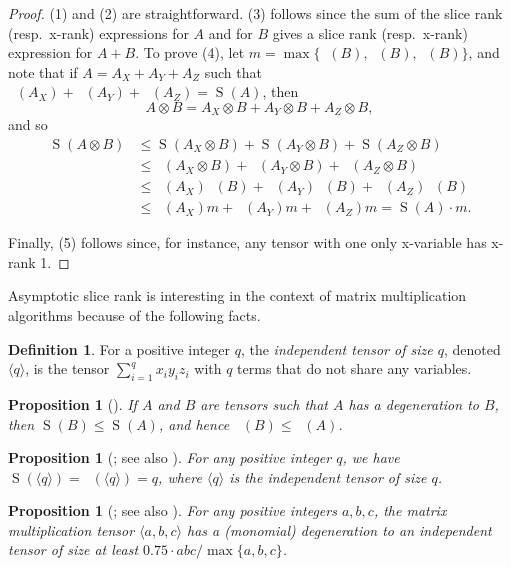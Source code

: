 \documentclass[11pt]{article}
\numberwithin{equation}{section}
\newtheorem{proposition}[theorem]{Proposition}
\theoremstyle{definition}
\newtheorem{definition}[theorem]{Definition}
\theoremstyle{plain}
\newcommand{\sr}{\mathop{\operatorname{S}}}
\newcommand{\xr}{\mathop{\operatorname{S_x}}}
\newcommand{\yr}{\mathop{\operatorname{S_y}}}
\newcommand{\zr}{\mathop{\operatorname{S_z}}}
\newcommand{\tsr}{\mathop{\tilde{\operatorname{S}}}}
\theoremstyle{definition}
\begin{document}
\begin{proof}
(1) and (2) are straightforward. (3) follows since the sum of the slice rank (resp.\ x-rank) expressions for $A$ and for $B$ gives a slice rank (resp.\ x-rank) expression for $A+B$. To prove (4), let $m = \max \{ \xr(B), \yr(B), \zr(B) \}$, and note that if $A = A_X + A_Y + A_Z$ such that $\xr(A_X) + \yr(A_Y) + \zr(A_Z) = \sr(A)$, then
$$A \otimes B = A_X\otimes B + A_Y\otimes B + A_Z\otimes B,$$
and so
\begin{align*}\sr(A \otimes B) &\leq \sr(A_X\otimes B) + \sr(A_Y\otimes B) + \sr(A_Z\otimes B) \\ &\leq \xr(A_X\otimes B) + \yr(A_Y\otimes B) + \zr(A_Z\otimes B)\\ &\leq \xr(A_X) \xr( B) + \yr(A_Y) \yr( B) + \zr(A_Z) \zr( B)\\ &\leq \xr(A_X) m + \yr(A_Y) m + \zr(A_Z) m = \sr(A) \cdot m.\end{align*}

Finally, (5) follows since, for instance, any tensor with one only x-variable has x-rank 1.
\end{proof}



Asymptotic slice rank is interesting in the context of matrix multiplication algorithms because of the following facts.

\begin{definition}
For a positive integer $q$, the \emph{independent tensor of size $q$}, denoted $\langle q \rangle$, is the tensor $\sum_{i=1}^q x_i y_i z_i$ with $q$ terms that do not share any variables.
\end{definition}

\begin{proposition}[{\cite[{Corollary 2}]{tao2}}] \label{propone}
If $A$ and $B$ are tensors such that $A$ has a degeneration to $B$, then $\sr(B) \leq \sr(A)$, and hence $\tsr(B) \leq \tsr(A)$.
\end{proposition}

\begin{proposition}[{\cite[{Lemma 1}]{tao1}}; see also {\cite[{Lemma 4.7}]{blasiak}}] \label{proptwo}
For any positive integer $q$, we have $\sr(\langle q \rangle) = \tsr(\langle q \rangle) = q$, where $\langle q \rangle$ is the independent tensor of size $q$.
\end{proposition}

\begin{proposition}[{\cite[{Theorem 6.6}]{strassenlaser1}}; see also {\cite[{Lemma 4.2}]{aw}}] \label{propthree}
For any positive integers $a,b,c$, the matrix multiplication tensor $\langle a,b,c \rangle$ has a (monomial) degeneration to an independent tensor of size at least $ 0.75 \cdot abc / \max \{a,b,c\}$.
\end{proposition}
\end{document}
